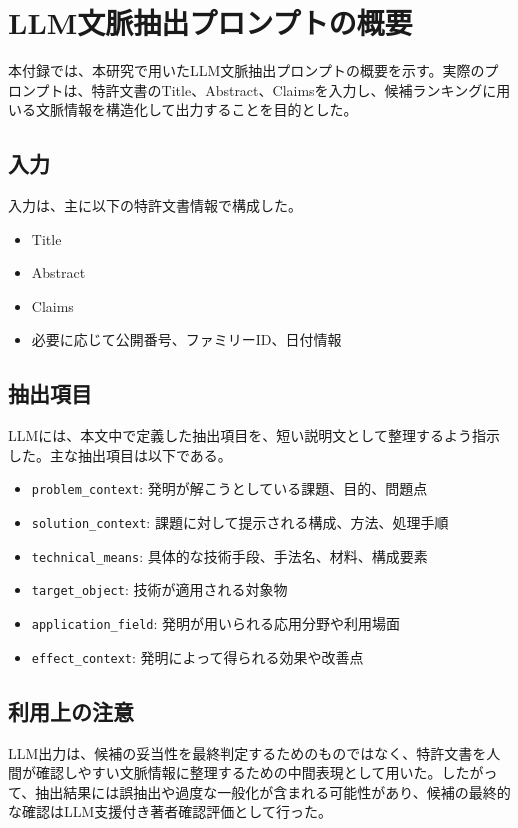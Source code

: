 \chapter{LLM文脈抽出プロンプトの概要}

本付録では、本研究で用いたLLM文脈抽出プロンプトの概要を示す。実際のプロンプトは、特許文書のTitle、Abstract、Claimsを入力し、候補ランキングに用いる文脈情報を構造化して出力することを目的とした。

\section{入力}

入力は、主に以下の特許文書情報で構成した。

\begin{itemize}
\item Title
\item Abstract
\item Claims
\item 必要に応じて公開番号、ファミリーID、日付情報
\end{itemize}

\section{抽出項目}

LLMには、本文中で定義した抽出項目を、短い説明文として整理するよう指示した。主な抽出項目は以下である。

\begin{itemize}
\item \texttt{problem\_context}: 発明が解こうとしている課題、目的、問題点
\item \texttt{solution\_context}: 課題に対して提示される構成、方法、処理手順
\item \texttt{technical\_means}: 具体的な技術手段、手法名、材料、構成要素
\item \texttt{target\_object}: 技術が適用される対象物
\item \texttt{application\_field}: 発明が用いられる応用分野や利用場面
\item \texttt{effect\_context}: 発明によって得られる効果や改善点
\end{itemize}

\section{利用上の注意}

LLM出力は、候補の妥当性を最終判定するためのものではなく、特許文書を人間が確認しやすい文脈情報に整理するための中間表現として用いた。したがって、抽出結果には誤抽出や過度な一般化が含まれる可能性があり、候補の最終的な確認はLLM支援付き著者確認評価として行った。
